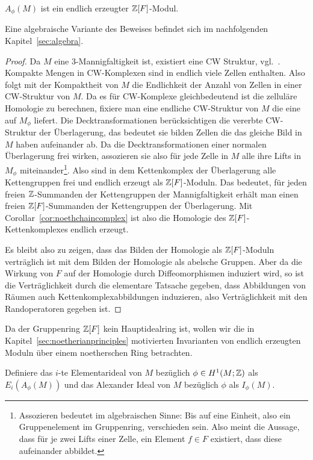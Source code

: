 \begin{prop}
\label{prop:alexendlerz}
		$A_\phi(M)$ ist ein endlich erzeugter $\mathbb{Z}[F]$-Modul.
\end{prop}
\begin{bem}\label{rem:AlexModulendlerz}
	Eine algebraische Variante des Beweises befindet sich im nachfolgenden Kapitel~\ref{sec:algebra}. 
\end{bem}

\begin{proof}
	Da $M$ eine 3-Mannigfaltigkeit ist, existiert eine CW Struktur, vgl.~\cite{Moise.1952}. Kompakte Mengen in CW-Komplexen sind in endlich viele Zellen enthalten. Also folgt mit der Kompaktheit von $M$ die Endlichkeit der Anzahl von Zellen in einer CW-Struktur von $M$. Da es für CW-Komplexe gleichbedeutend ist die zelluläre Homologie zu berechnen, fixiere man eine endliche CW-Struktur von $M$ die eine auf $M_\phi$ liefert. Die Decktransformationen berücksichtigen die vererbte CW-Struktur der Überlagerung, das bedeutet sie bilden Zellen die das gleiche Bild in $M$ haben aufeinander ab. Da die Decktransformationen einer normalen Überlagerung frei wirken, assozieren sie also für jede Zelle in $M$ alle ihre Lifts in $M_\phi$ miteinander\footnote{Assozieren bedeutet im algebraischen Sinne: Bis auf eine Einheit, also ein Gruppenelement im Gruppenring, verschieden sein. Also meint die Aussage, dass für je zwei Lifts einer Zelle, ein Element $f\in F$ existiert, dass diese aufeinander abbildet.}. Also sind in dem Kettenkomplex der Überlagerung alle Kettengruppen frei und endlich erzeugt als $\mathbb{Z}[F]$-Moduln. Das bedeutet, für jeden freien $\mathbb{Z}$-Summanden der Kettengruppen der Mannigfaltigkeit erhält man einen freien $\mathbb{Z}[F]$-Summanden der Kettengruppen der Überlagerung. Mit Corollar~\ref{cor:noethchaincomplex} ist also die Homologie des $\mathbb{Z}[F]$-Kettenkomplexes endlich erzeugt. 

	Es bleibt also zu zeigen, dass das Bilden der Homologie als $\mathbb{Z}[F]$-Moduln verträglich ist mit dem Bilden der Homologie als abelsche Gruppen. Aber da die Wirkung von $F$ auf der Homologie durch Diffeomorphismen induziert wird, so ist die Verträglichkeit durch die elementare Tatsache gegeben, dass Abbildungen von Räumen auch Kettenkomplexabbildungen induzieren, also Verträglichkeit mit den Randoperatoren gegeben ist.
\end{proof}

%

     	Da der Gruppenring $\mathbb{Z}[F]$ kein Hauptidealring ist, wollen wir die in Kapitel~\ref{sec:noetherianprinciples} motivierten Invarianten von endlich erzeugten Moduln über einem noetherschen Ring betrachten.
     	\begin{defn}
     		Definiere das $i$-te Elementarideal von $M$ bezüglich $\phi\in H^1(M;\mathbb{Z})$ als $E_i(A_\phi(M))$ und das Alexander Ideal von $M$ bezüglich $\phi$ als $I_\phi(M)$.
     	\end{defn}


